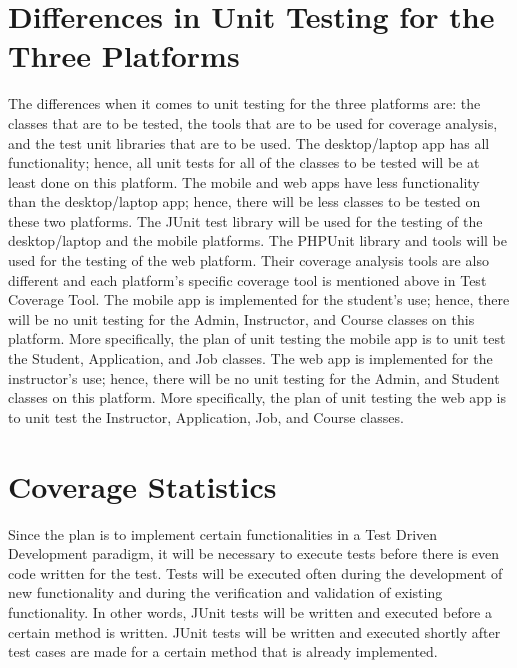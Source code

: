 \documentclass[12pt]{report}
\begin{document}
    
    \section{Differences in Unit Testing for the Three Platforms}
    
    The differences when it comes to unit testing for the three platforms are: the classes that
    are to be tested, the tools that are to be used for coverage analysis, and the test unit libraries that
    are to be used.
    The desktop/laptop app has all functionality; hence, all unit tests for all of the classes to be
    tested will be at least done on this platform. The mobile and web apps have less functionality
    than the desktop/laptop app; hence, there will be less classes to be tested on these two
    platforms. 
    The JUnit test library will be used for the testing of the desktop/laptop and the mobile platforms. The
    PHPUnit library and tools will be used for the testing of the web platform. Their coverage analysis tools are also
    different and each platform's specific coverage tool is mentioned above in Test Coverage Tool.
    The mobile app is implemented for the student's use; hence, there will be no
    unit testing for the Admin, Instructor, and Course classes on this platform. More specifically,
    the plan of unit testing the mobile app is to unit test the Student, Application, and Job
    classes. 
    The web app is implemented for the instructor's use; hence, there will be no unit testing for
    the Admin, and Student classes on this platform. More specifically, the plan of unit testing the
    web app is to unit test the Instructor, Application, Job, and Course classes.
    
    \section{Coverage Statistics}
    
    Since the plan is to implement certain functionalities in a Test Driven Development paradigm, it
    will be necessary to execute tests before there is even code written for the test. Tests will be
    executed often during the development of new functionality and during the verification and
    validation of existing functionality. In other words, JUnit tests will be written and executed
    before a certain method is written. JUnit tests will be written and executed shortly after test
    cases are made for a certain method that is already implemented. 
    
\end{document}
